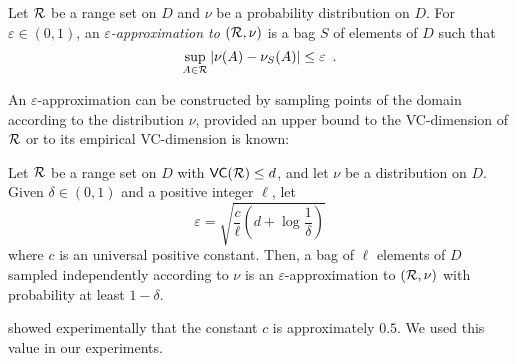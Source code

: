 \begin{definition}\label{def:eapprox}
  Let $\mathcal{R}$ be a range set on %
  $D$ and $\nu$ be a probability distribution on $D$. For $\varepsilon\in(0,1)$,
  an \emph{$\varepsilon$-approximation to $(\mathcal{R},\nu)$} is a bag $S$ of
  elements of $D$ such that 
  \[
  \sup_{A\in\mathcal{R}}|\nu(A)-\nu_S(A)|\le\varepsilon\enspace.\]
\end{definition}

An $\varepsilon$-approximation can be constructed by sampling points of
the domain according to the distribution $\nu$, provided an upper bound to the
VC-dimension of $\mathcal{R}$ or to its empirical VC-dimension is known:

\begin{theorem}\label{thm:eapprox}
  Let $\mathcal{R}$ be a range set on %
  $D$ with $\mathsf{VC}(\mathcal{R})\le d$, and let $\nu$ be a distribution on $D$. Given
  $\delta\in(0,1)$ and a positive integer $\ell$, let
  \begin{equation}\label{eq:vceapprox}
    \varepsilon = \sqrt{\frac{c}{\ell}\left(d + \log\frac{1}{\delta}\right)}
  \end{equation}
  where $c$ is an universal positive constant. Then, a bag of $\ell$
  elements of $D$ sampled independently according to $\nu$ is an
  $\varepsilon$-approximation to $(\mathcal{R},\nu)$ with probability at least
  $1-\delta$.
\end{theorem}
\citet{LofflerP09} showed experimentally that the constant $c$ is approximately
$0.5$. We used this value in our experiments.

